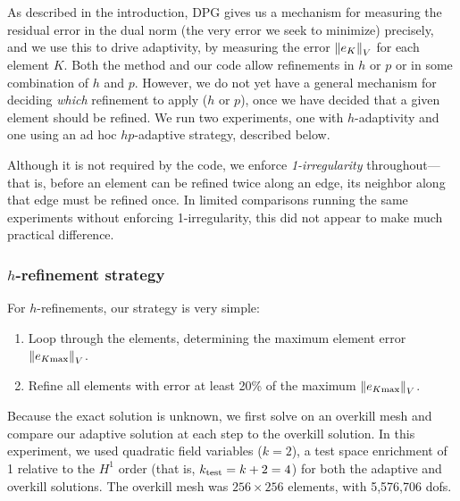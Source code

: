 As described in the introduction, DPG gives us a mechanism for measuring the residual error in the dual norm (the very error we seek to minimize) precisely, and we use this to drive adaptivity, by measuring the error $\norm{e_{K}}_{V}$ for each element $K$.  Both the method and our code allow refinements in $h$ or $p$ or in some combination of $h$ and $p$.  However, we do not yet have a general mechanism for deciding \emph{which} refinement to apply ($h$ or $p$), once we have decided that a given element should be refined.  We run two experiments, one with $h$-adaptivity and one using an ad hoc $hp$-adaptive strategy, described below.

Although it is not required by the code, we enforce \emph{1-irregularity} throughout---that is, before an element can be refined twice along an edge, its neighbor along that edge must be refined once.  In limited comparisons running the same experiments without enforcing 1-irregularity, this did not appear to make much practical difference.

\subsubsection{$h$-refinement strategy}
For $h$-refinements, our strategy is very simple:
\begin{enumerate}
\item Loop through the elements, determining the maximum element error $\norm{e_{K{\rm max}}}_{V}$.
\item Refine all elements with error at least 20\% of the maximum $\norm{e_{K{\rm max}}}_{V}$.
\end{enumerate}

Because the exact solution is unknown, we first solve on an overkill mesh and compare our adaptive solution at each step to the overkill solution.  In this experiment, we used quadratic field variables ($k=2$), a test space enrichment of 1 relative to the $H^{1}$ order (that is, $k_{\rm test} = k + 2 = 4$) for both the adaptive and overkill solutions.  The overkill mesh was $256 \times 256$ elements, with 5,576,706 dofs.

